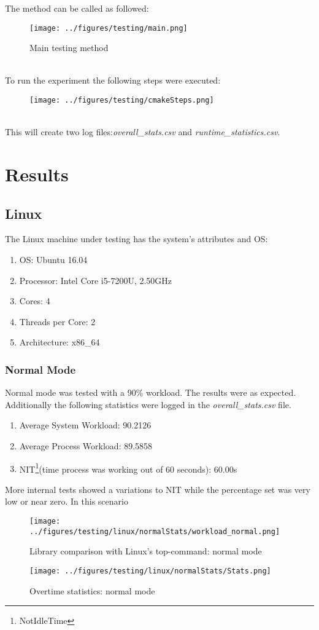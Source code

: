 The method can be called as followed:
\begin{figure}[!htbp]
	\texttt{[image: ../figures/testing/main.png]}
	\caption{Main testing method}
\end{figure}\\
To run the experiment the following steps were executed:\\
\begin{figure}[!htbp]
	\centering
	\texttt{[image: ../figures/testing/cmakeSteps.png]}
\end{figure}\\
This will create two log files:\textit{overall\_stats.csv} and \textit{runtime\_statistics.csv}.

\section{Results}
\subsection{Linux}
The Linux machine under testing has the system's attributes and OS:
\begin{enumerate}
	\item OS: 				Ubuntu 16.04
	\item Processor: 		Intel Core i5-7200U, 2.50GHz
	\item Cores:			4
	\item Threads per Core:	2
	\item Architecture: 	x86\_64
\end{enumerate}
\subsubsection{Normal Mode}
Normal mode was tested with a 90\% workload. The results were as expected. Additionally the following statistics were logged in the \textit{overall\_stats.csv} file.
\begin{enumerate}
	\item Average System Workload: 90.2126
	\item Average Process Workload: 89.5858
	\item NIT\footnote{NotIdleTime}(time process was working out of 60 seconds): 60.00s 
\end{enumerate}  
More internal tests showed a variations to NIT while the percentage set was very low or near zero. In this scenario 
\begin{figure}[!htbp]
	\centering
	\begin{minipage}[b]{\textwidth}
		\centering
		\texttt{[image: ../figures/testing/linux/normalStats/workload\_normal.png]}
		\caption{Library comparison with Linux's top-command: normal mode}
		\hspace{3mm}
	\end{minipage}
	\begin{minipage}[b]{\textwidth}
		\centering
		\texttt{[image: ../figures/testing/linux/normalStats/Stats.png]}
		\caption{Overtime statistics: normal mode}
	\end{minipage}
\end{figure}

